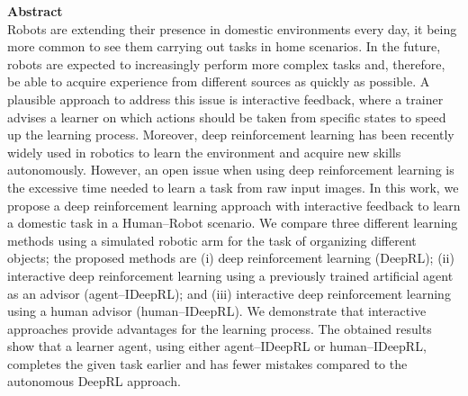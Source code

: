 \documentclass[report.tex]{subfiles}
\begin{document}
\noindent\textbf{Abstract} \\
Robots are extending their presence in domestic environments every day, it being more
common to see them carrying out tasks in home scenarios. In the future, robots are expected to
increasingly perform more complex tasks and, therefore, be able to acquire experience from different
sources as quickly as possible. A plausible approach to address this issue is interactive feedback,
where a trainer advises a learner on which actions should be taken from specific states to speed
up the learning process. Moreover, deep reinforcement learning has been recently widely used in
robotics to learn the environment and acquire new skills autonomously. However, an open issue
when using deep reinforcement learning is the excessive time needed to learn a task from raw
input images. In this work, we propose a deep reinforcement learning approach with interactive
feedback to learn a domestic task in a Human–Robot scenario. We compare three different learning
methods using a simulated robotic arm for the task of organizing different objects; the proposed
methods are (i) deep reinforcement learning (DeepRL); (ii) interactive deep reinforcement learning
using a previously trained artificial agent as an advisor (agent–IDeepRL); and (iii) interactive deep
reinforcement learning using a human advisor (human–IDeepRL). We demonstrate that interactive
approaches provide advantages for the learning process. The obtained results show that a learner
agent, using either agent–IDeepRL or human–IDeepRL, completes the given task earlier and has
fewer mistakes compared to the autonomous DeepRL approach.\\
\end{document}
